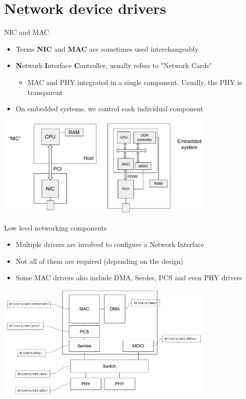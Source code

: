 \section{Network device drivers}

\begin{frame}{NIC and MAC}
	\begin{itemize}
		\item Terms \textbf{NIC} and \textbf{MAC} are sometimes used interchangeably
		\item \textbf{N}etwork \textbf{I}nterface \textbf{C}ontroller, usually refers to "Network Cards"
			\begin{itemize}
				\item MAC and PHY integrated in a single component. Usually, the PHY is transparent
			\end{itemize}
		\item On embedded systems, we control each individual component
	\end{itemize}
	\begin{center}
	\includegraphics[width=0.8\textwidth]{slides/networking-driver-overview/nic.pdf}
	\end{center}
\end{frame}


\begin{frame}{Low level networking components}
	\begin{itemize}
		\item Multiple drivers are involved to configure a Network Interface
		\item Not all of them are required (depending on the design)
		\item Some MAC drivers also include DMA, Serdes, PCS and even PHY drivers
	\end{itemize}
	\begin{center}
	\includegraphics[width=0.8\textwidth]{slides/networking-driver-overview/net_drivers.pdf}
	\end{center}
\end{frame}

